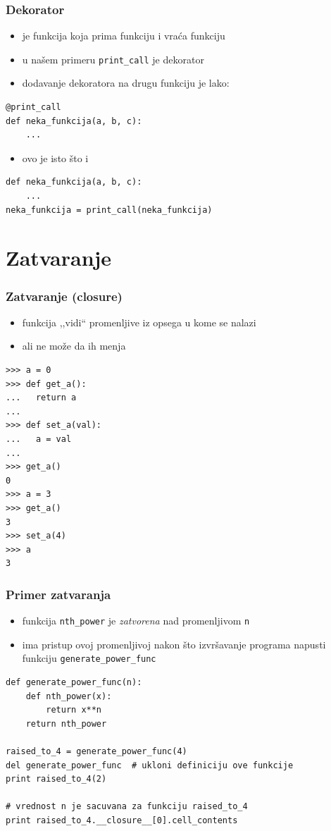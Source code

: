 \documentclass[compress]{beamer}
\begin{document}
\begin{frame}[fragile]
  \frametitle{Dekorator}
  \begin{itemize}
    \item {} je funkcija koja prima funkciju i vraća funkciju
    \item u našem primeru \texttt{print\_call} je dekorator
    \item dodavanje dekoratora na drugu funkciju je lako:
  \end{itemize}
\begin{verbatim}
@print_call
def neka_funkcija(a, b, c):
    ...
\end{verbatim}
  \begin{itemize}
    \item ovo je isto što i
  \end{itemize}
\begin{verbatim}
def neka_funkcija(a, b, c):
    ...
neka_funkcija = print_call(neka_funkcija)
\end{verbatim}
\end{frame}

\section[Closure]{Zatvaranje}

\begin{frame}[fragile,shrink=10]
  \frametitle{Zatvaranje (closure)}
  \begin{itemize}
    \item funkcija ,,vidi`` promenljive iz opsega u kome se nalazi
    \item ali ne može da ih menja
    \end{itemize}
\begin{verbatim}
>>> a = 0
>>> def get_a():
...   return a
...
>>> def set_a(val):
...   a = val
...
>>> get_a()
0
>>> a = 3
>>> get_a()
3
>>> set_a(4)
>>> a
3
\end{verbatim}
\end{frame}

\begin{frame}[fragile]
  \frametitle{Primer zatvaranja}
  \begin{itemize}
    \item funkcija \texttt{nth\_power} je \textit{zatvorena} nad promenljivom \texttt{n}
    \item ima pristup ovoj promenljivoj nakon što izvršavanje programa napusti funkciju \texttt{generate\_power\_func}
    \end{itemize}
\begin{verbatim}
def generate_power_func(n):
    def nth_power(x):
        return x**n
    return nth_power

raised_to_4 = generate_power_func(4)
del generate_power_func  # ukloni definiciju ove funkcije
print raised_to_4(2)

# vrednost n je sacuvana za funkciju raised_to_4
print raised_to_4.__closure__[0].cell_contents  
\end{verbatim}
\end{frame}
\end{document}
